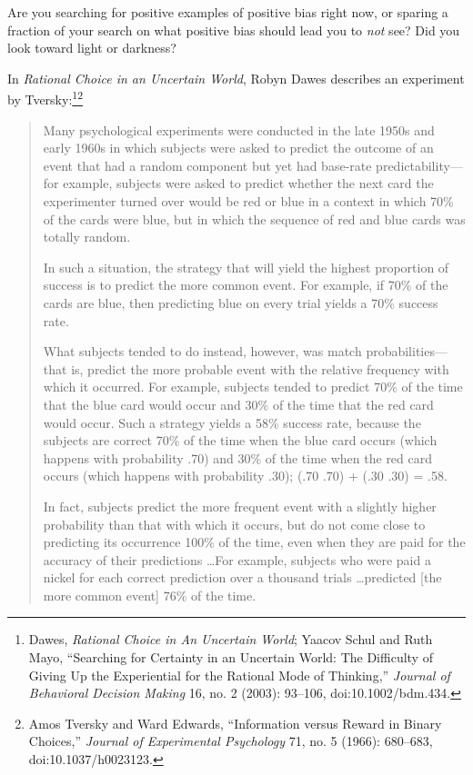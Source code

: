 {
 Are you searching for positive examples of positive bias right
now, or sparing a fraction of your search on what positive bias should
lead you to \textit{not} see? Did you look toward light or darkness?}

\myendsectiontext


\bigskip


{
 In \textit{Rational Choice in an Uncertain World}, Robyn Dawes
describes an experiment by Tversky:\footnote{Dawes, \textit{Rational Choice in An Uncertain World}; Yaacov
Schul and Ruth Mayo, ``Searching for Certainty in an
Uncertain World: The Difficulty of Giving Up the Experiential for the
Rational Mode of Thinking,'' \textit{Journal of
Behavioral Decision Making} 16, no. 2 (2003): 93--106,
doi:10.1002/bdm.434.}\supercomma\footnote{Amos Tversky and Ward Edwards, ``Information
versus Reward in Binary Choices,'' \textit{Journal of
Experimental Psychology} 71, no. 5 (1966): 680--683,
doi:10.1037/h0023123.}}

\begin{quotation}
{
 Many psychological experiments were conducted in the late 1950s
and early 1960s in which subjects were asked to predict the outcome of
an event that had a random component but yet had base-rate
predictability---for example, subjects were asked to predict whether
the next card the experimenter turned over would be red or blue in a
context in which 70\% of the cards were blue, but in which the sequence
of red and blue cards was totally random.}

{
 In such a situation, the strategy that will yield the highest
proportion of success is to predict the more common event. For example,
if 70\% of the cards are blue, then predicting blue on every trial
yields a 70\% success rate.}

{
 What subjects tended to do instead, however, was match
probabilities---that is, predict the more probable event with the
relative frequency with which it occurred. For example, subjects tended
to predict 70\% of the time that the blue card would occur and 30\% of
the time that the red card would occur. Such a strategy yields a 58\%
success rate, because the subjects are correct 70\% of the time when
the blue card occurs (which happens with probability .70) and 30\% of
the time when the red card occurs (which happens with probability .30);
(.70 {\texttimes} .70) + (.30 {\texttimes} .30) = .58.}

{
 In fact, subjects predict the more frequent event with a slightly
higher probability than that with which it occurs, but do not come
close to predicting its occurrence 100\% of the time, even when they
are paid for the accuracy of their predictions \ldots For example,
subjects who were paid a nickel for each correct prediction over a
thousand trials \ldots predicted [the more common event] 76\% of the
time.}
\end{quotation}

